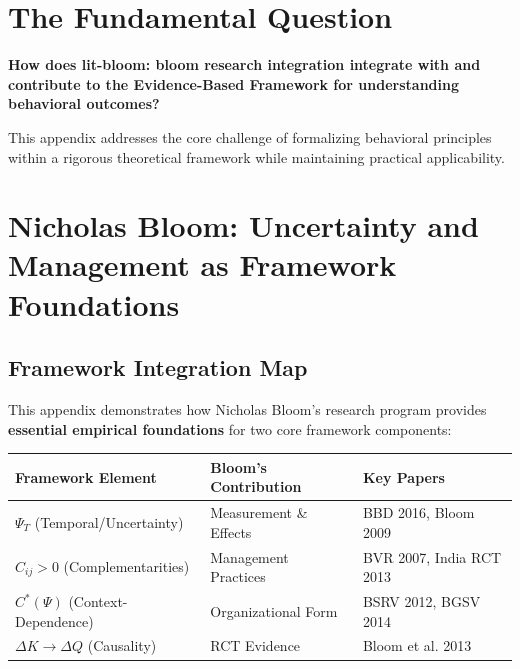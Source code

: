 \section{The Fundamental Question}
\label{sec:blm-fundamental}

\begin{tcolorbox}[
    colback=red!5!white,
    colframe=red!75!black,
    title={\textbf{Fundamental Question}}
]
\textbf{How does lit-bloom: bloom research integration integrate with and contribute to the
Evidence-Based Framework for understanding behavioral outcomes?}

This appendix addresses the core challenge of formalizing behavioral principles
within a rigorous theoretical framework while maintaining practical applicability.
\end{tcolorbox}




\section{Nicholas Bloom: Uncertainty and Management as Framework Foundations}
\label{app:bloom}

\subsection{Framework Integration Map}

This appendix demonstrates how Nicholas Bloom's research program provides 
\textbf{essential empirical foundations} for two core framework components:

\begin{center}
\renewcommand{\arraystretch}{1.4}
\begin{tabular}{|l|l|l|}
\hline
\textbf{Framework Element} & \textbf{Bloom's Contribution} & \textbf{Key Papers} \\
\hline
$\Psi_T$ (Temporal/Uncertainty) & Measurement \& Effects & BBD 2016, Bloom 2009 \\
$C_{ij} > 0$ (Complementarities) & Management Practices & BVR 2007, India RCT 2013 \\
$C^*(\Psi)$ (Context-Dependence) & Organizational Form & BSRV 2012, BGSV 2014 \\
$\Delta K \to \Delta Q$ (Causality) & RCT Evidence & Bloom et al. 2013 \\
\hline
\end{tabular}
\end{center}

